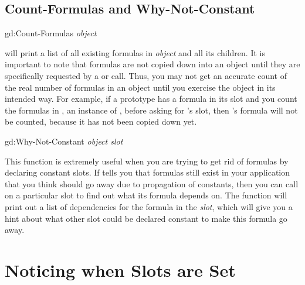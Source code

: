 \begin{group}
\section{Count-Formulas and Why-Not-Constant}
\label{count-formulas}

\begin{programexample}
gd:Count-Formulas {\it object}\value{function}
\end{programexample}

 will print a list of all existing formulas in {\it object}
and all its children.  It is important to note that formulas are not copied
down into an object until they are specifically requested by a 
or  call.  Thus, you may not get an accurate count of the real number
of formulas in an object until you exercise the object in its intended way.
For example, if a prototype  has a formula in its
 slot and you count the formulas in , an instance of ,
before asking for 's  slot, then 's  formula
will not be counted, because it has not been copied down yet.
\end{group}
\vspace{1 line}


\begin{group}
\begin{programexample}
gd:Why-Not-Constant {\it object  slot}\value{function}
\end{programexample}

This function is extremely useful when you are trying to get rid of formulas
by declaring constant slots.  If  tells you that formulas
still exist in your application that you think should go away due to
propagation of constants, then you can call  on a
particular slot to find out what its formula depends on.  The function will
print out a list of dependencies for the formula in the {\it slot}, which will
give you a hint about what other slot could be declared constant to make
this formula go away.
\end{group}



\chapter{Noticing when Slots are Set}
\label{notify-on-slot-set-sec}

